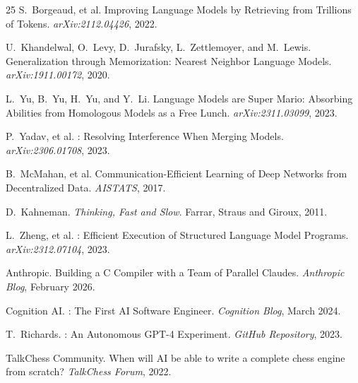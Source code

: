 \documentclass[11pt,a4paper]{article}
\begin{document}
\begin{thebibliography}{25}
S.~Borgeaud, et al.
\newblock Improving Language Models by Retrieving from Trillions of Tokens.
\newblock \textit{arXiv:2112.04426}, 2022.

U.~Khandelwal, O.~Levy, D.~Jurafsky, L.~Zettlemoyer, and M.~Lewis.
\newblock Generalization through Memorization: Nearest Neighbor Language Models.
\newblock \textit{arXiv:1911.00172}, 2020.

L.~Yu, B.~Yu, H.~Yu, and Y.~Li.
\newblock Language Models are Super Mario: Absorbing Abilities from Homologous Models as a Free Lunch.
\newblock \textit{arXiv:2311.03099}, 2023.

P.~Yadav, et al.
: Resolving Interference When Merging Models.
\newblock \textit{arXiv:2306.01708}, 2023.

B.~McMahan, et al.
\newblock Communication-Efficient Learning of Deep Networks from Decentralized Data.
\newblock \textit{AISTATS}, 2017.

D.~Kahneman.
\newblock \textit{Thinking, Fast and Slow}.
\newblock Farrar, Straus and Giroux, 2011.

L.~Zheng, et al.
: Efficient Execution of Structured Language Model Programs.
\newblock \textit{arXiv:2312.07104}, 2023.

Anthropic.
\newblock Building a {C} Compiler with a Team of Parallel {Claudes}.
\newblock \textit{Anthropic Blog}, February 2026.

Cognition AI.
: The First AI Software Engineer.
\newblock \textit{Cognition Blog}, March 2024.

T.~Richards.
: An Autonomous GPT-4 Experiment.
\newblock \textit{GitHub Repository}, 2023.

TalkChess Community.
\newblock When will {AI} be able to write a complete chess engine from scratch?
\newblock \textit{TalkChess Forum}, 2022.

\end{thebibliography}
\end{document}
